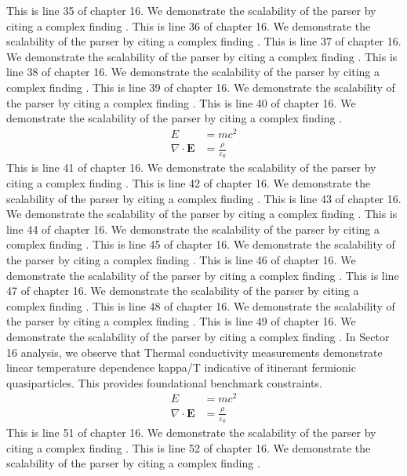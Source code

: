 This is line 35 of chapter 16. We demonstrate the scalability of the parser by citing a complex finding \cite{ref16_35}.
This is line 36 of chapter 16. We demonstrate the scalability of the parser by citing a complex finding \cite{ref16_36}.
This is line 37 of chapter 16. We demonstrate the scalability of the parser by citing a complex finding \cite{ref16_37}.
This is line 38 of chapter 16. We demonstrate the scalability of the parser by citing a complex finding \cite{ref16_38}.
This is line 39 of chapter 16. We demonstrate the scalability of the parser by citing a complex finding \cite{ref16_39}.
This is line 40 of chapter 16. We demonstrate the scalability of the parser by citing a complex finding \cite{ref16_40}.
\begin{align*}
  E &= mc^2 \\
  \nabla \cdot \mathbf{E} &= \frac{\rho}{\varepsilon_0}
\end{align*}
This is line 41 of chapter 16. We demonstrate the scalability of the parser by citing a complex finding \cite{ref16_41}.
This is line 42 of chapter 16. We demonstrate the scalability of the parser by citing a complex finding \cite{ref16_42}.
This is line 43 of chapter 16. We demonstrate the scalability of the parser by citing a complex finding \cite{ref16_43}.
This is line 44 of chapter 16. We demonstrate the scalability of the parser by citing a complex finding \cite{ref16_44}.
This is line 45 of chapter 16. We demonstrate the scalability of the parser by citing a complex finding \cite{ref16_45}.
This is line 46 of chapter 16. We demonstrate the scalability of the parser by citing a complex finding \cite{ref16_46}.
This is line 47 of chapter 16. We demonstrate the scalability of the parser by citing a complex finding \cite{ref16_47}.
This is line 48 of chapter 16. We demonstrate the scalability of the parser by citing a complex finding \cite{ref16_48}.
This is line 49 of chapter 16. We demonstrate the scalability of the parser by citing a complex finding \cite{ref16_49}.
In Sector 16 analysis, we observe that Thermal conductivity measurements demonstrate linear temperature dependence kappa/T indicative of itinerant fermionic quasiparticles. This provides foundational benchmark constraints.
\begin{align*}
  E &= mc^2 \\
  \nabla \cdot \mathbf{E} &= \frac{\rho}{\varepsilon_0}
\end{align*}
This is line 51 of chapter 16. We demonstrate the scalability of the parser by citing a complex finding \cite{ref16_51}.
This is line 52 of chapter 16. We demonstrate the scalability of the parser by citing a complex finding \cite{ref16_52}.
